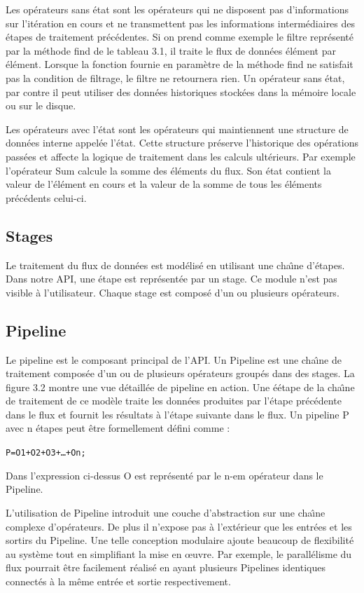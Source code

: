 Les op\'erateurs sans \'etat sont les op\'erateurs qui ne disposent pas d'informations sur l'it\'eration en cours et ne transmettent pas les informations interm\'ediaires des \'etapes de traitement pr\'ec\'edentes. Si on prend comme exemple le filtre repr\'esent\'e par la m\'ethode find de le tableau 3.1, il traite le flux de donn\'ees \'el\'ement par \'el\'ement. Lorsque la fonction fournie en param\`etre de la m\'ethode find ne satisfait pas la condition de filtrage, le filtre ne retournera rien. Un op\'erateur sans \'etat, par contre il peut utiliser des donn\'ees historiques stock\'ees dans la m\'emoire locale ou sur le disque.

Les op\'erateurs avec l'\'etat sont les op\'erateurs qui maintiennent une structure de donn\'ees interne appel\'ee l'\'etat. Cette structure pr\'eserve l'historique des op\'erations pass\'ees et affecte la logique de traitement dans les calculs ult\'erieurs. Par exemple l'op\'erateur Sum calcule la somme des \'el\'ements du flux. Son \'etat contient la valeur de l'\'el\'ement en cours et la valeur de la somme de tous les \'el\'ements pr\'ec\'edents celui-ci. 



\subsection{Stages}

Le traitement du flux de donn\'ees est mod\'elis\'e en utilisant une cha\^{\i}ne d'\'etapes. Dans notre API, une \'etape est repr\'esent\'ee par un stage. Ce module n'est pas visible \`a l'utilisateur. Chaque stage est compos\'e d'un ou plusieurs op\'erateurs. 


\subsection{Pipeline}

Le pipeline est le composant principal de l'API. Un Pipeline est une cha\^{\i}ne de traitement compos\'ee d'un ou de plusieurs op\'erateurs group\'es dans des stages. La figure 3.2 montre une vue d\'etaill\'ee de pipeline en action. Une \'eétape de la cha\^{\i}ne de traitement de ce mod\`ele traite les donn\'ees produites par l'\'etape pr\'ec\'edente dans le flux et fournit les r\'esultats \`a l'étape suivante dans le flux. Un pipeline P avec n \'etapes peut \^etre formellement d\'efini comme :


{\small
\begin{alltt}
	P = O1 + O2 + O3 + … + On;
\end{alltt}
}

Dans l'expression ci-dessus O est repr\'esent\'e par le n-em op\'erateur dans le Pipeline.

L'utilisation de Pipeline introduit une couche d'abstraction sur une cha\^{\i}ne complexe d'op\'erateurs. De plus il n'expose pas à l'ext\'erieur que les entr\'ees et les sortirs du Pipeline. Une telle conception modulaire ajoute beaucoup de flexibilit\'e au syst\`eme tout en simplifiant la mise en œuvre. Par exemple, le parall\'elisme du flux pourrait \^etre facilement r\'ealis\'e en ayant plusieurs Pipelines identiques connect\'es \`a la m\^eme entr\'ee et sortie respectivement.


